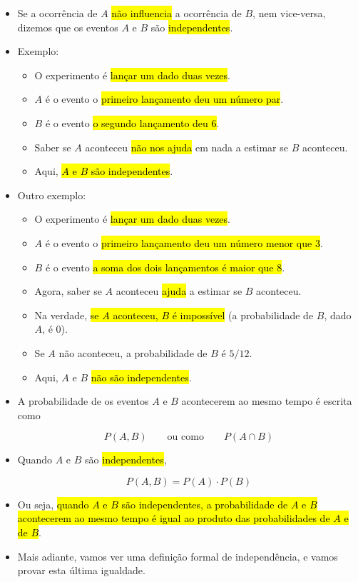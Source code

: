 \documentclass[
  11pt]{report}
\begin{document}
\begin{itemize}
\item
  Se a ocorrência de $A$ {\hl{não influencia}} a ocorrência de $B$, nem vice-versa, dizemos que os eventos $A$ e $B$ são {\hl{independentes}}.
\item
  Exemplo:

  \begin{itemize}
  \item
    O experimento é {\hl{lançar um dado duas vezes}}.
  \item
    $A$ é o evento o {\hl{primeiro lançamento deu um número par}}.
  \item
    $B$ é o evento {\hl{o segundo lançamento deu 6}}.
  \item
    Saber se $A$ aconteceu {\hl{não nos ajuda}} em nada a estimar se $B$ aconteceu.
  \item
    Aqui, {\hl{$A$ e $B$ são independentes}}.
  \end{itemize}
\item
  Outro exemplo:

  \begin{itemize}
  \item
    O experimento é {\hl{lançar um dado duas vezes}}.
  \item
    $A$ é o evento o {\hl{primeiro lançamento deu um número menor que $3$}}.
  \item
    $B$ é o evento {\hl{a soma dos dois lançamentos é maior que $8$}}.
  \item
    Agora, saber se $A$ aconteceu {\hl{ajuda}} a estimar se $B$ aconteceu.
  \item
    Na verdade, {\hl{se $A$ aconteceu, $B$ é impossível}} (a probabilidade de $B$, dado $A$, é $0$).
  \item
    Se $A$ não aconteceu, a probabilidade de $B$ é $5/12$.
  \item
    Aqui, $A$ e $B$ {\hl{não são independentes}}.
  \end{itemize}
\item
  \protect\hypertarget{independentes-produto}{}{} A probabilidade de os eventos $A$ e $B$ acontecerem ao mesmo tempo é escrita como

  \[
  P(A, B) \qquad \text{ou como} \qquad P(A \cap B)
  \]
\item
  Quando $A$ e $B$ são {\hl{independentes}},

  \[
  P(A, B) = P(A) \cdot P(B)
  \]
\item
  Ou seja, {\hl{quando $A$ e $B$ são independentes, a probabilidade de $A$ e $B$ acontecerem ao mesmo tempo é igual ao produto das probabilidades de $A$ e de $B$}}.
\item
  Mais adiante, vamos ver uma definição formal de independência, e vamos provar esta última igualdade.
\end{itemize}
\end{document}
